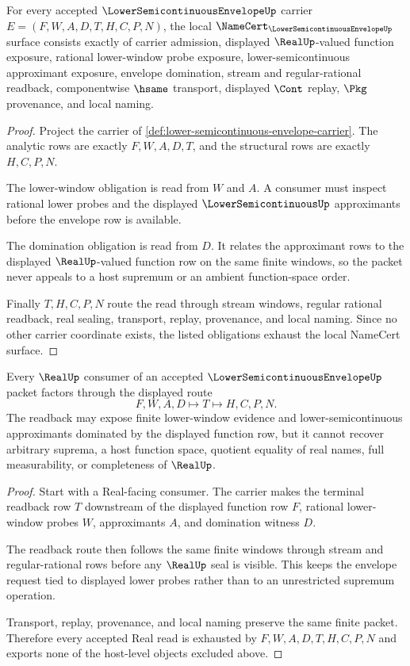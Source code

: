 \begin{theorem}
\label{thm:lower-semicontinuous-envelope-namecert-obligations}
For every accepted $\LowerSemicontinuousEnvelopeUp$ carrier $E=(F,W,A,D,T,H,C,P,N)$, the local $\NameCert_{\LowerSemicontinuousEnvelopeUp}$ surface consists exactly of carrier admission, displayed $\RealUp$-valued function exposure, rational lower-window probe exposure, lower-semicontinuous approximant exposure, envelope domination, stream and regular-rational readback, componentwise $\hsame$ transport, displayed $\Cont$ replay, $\Pkg$ provenance, and local naming.
\end{theorem}
\begin{proof}
Project the carrier of \autoref{def:lower-semicontinuous-envelope-carrier}. The analytic rows are exactly $F,W,A,D,T$, and the structural rows are exactly $H,C,P,N$.

The lower-window obligation is read from $W$ and $A$. A consumer must inspect rational lower probes and the displayed $\LowerSemicontinuousUp$ approximants before the envelope row is available.

The domination obligation is read from $D$. It relates the approximant rows to the displayed $\RealUp$-valued function row on the same finite windows, so the packet never appeals to a host supremum or an ambient function-space order.

Finally $T,H,C,P,N$ route the read through stream windows, regular rational readback, real sealing, transport, replay, provenance, and local naming. Since no other carrier coordinate exists, the listed obligations exhaust the local NameCert surface.
\end{proof}

\begin{theorem}
\label{thm:lower-semicontinuous-envelope-real-readback}
Every $\RealUp$ consumer of an accepted $\LowerSemicontinuousEnvelopeUp$ packet factors through the displayed route
$$
F,W,A,D \longmapsto T \longmapsto H,C,P,N .
$$
The readback may expose finite lower-window evidence and lower-semicontinuous approximants dominated by the displayed function row, but it cannot recover arbitrary suprema, a host function space, quotient equality of real names, full measurability, or completeness of $\RealUp$.
\end{theorem}
\begin{proof}
Start with a Real-facing consumer. The carrier makes the terminal readback row $T$ downstream of the displayed function row $F$, rational lower-window probes $W$, approximants $A$, and domination witness $D$.

The readback route then follows the same finite windows through stream and regular-rational rows before any $\RealUp$ seal is visible. This keeps the envelope request tied to displayed lower probes rather than to an unrestricted supremum operation.

Transport, replay, provenance, and local naming preserve the same finite packet. Therefore every accepted Real read is exhausted by $F,W,A,D,T,H,C,P,N$ and exports none of the host-level objects excluded above.
\end{proof}

